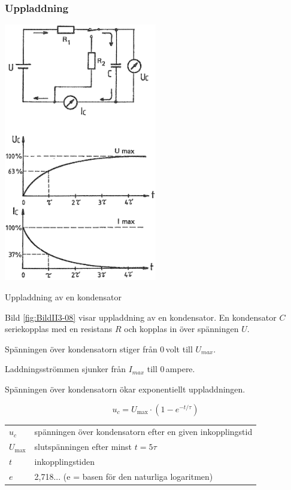 \subsubsection{Uppladdning}

\begin{marginfigure}%
  \includegraphics[width=0.5\textwidth]{images/cropped_pdfs/bild_2_3-08.pdf}
  \caption{Uppladdning av en kondensator}
  \label{fig:BildII3-08}
\end{marginfigure}

Bild \ref{fig:BildII3-08} visar uppladdning av en kondensator.
En kondensator \(C\) seriekopplas med en resistans \(R\)
och kopplas in över spänningen \(U\).

Spänningen över kondensatorn stiger från 0\,volt till \(U_{max}\).

Laddningsströmmen sjunker från \(I_{max}\) till 0\,ampere.

Spänningen över kondensatorn ökar exponentiellt uppladdningen.

\[ u_c = U_{\text{max}} \cdot \left( 1 - e^{-t/\tau} \right) \]

\begin{tabular}{lp{\textwidth}}
  \(u_c\)         & spänningen över kondensatorn efter en given inkopplingstid \\
  \(U_{\text{max}}\) & slutspänningen efter minst \(t = 5\tau\) \\
  \(t\)           & inkopplingstiden \\
  \(e\)           & 2,718... (e = basen för den naturliga logaritmen) \\
\end{tabular}\\[\baselineskip]

